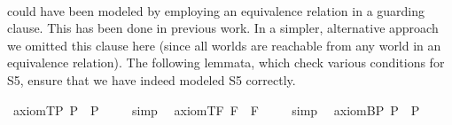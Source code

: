 \begin{isabellebody}
\endisatagproof
{\isafoldproof}%
%
\isadelimproof
%
\endisadelimproof
\ \isamarkupfalse%
%
\isadelimproof
\ %
\endisadelimproof
%
\isatagproof
{}\isamarkupfalse%
\ %
%
\endisatagproof
{\isafoldproof}%
%
\isadelimproof
%
\endisadelimproof
%
\isamarkuptrue%
%
\begin{isamarkuptext}%
\isa{{\isasymbox}} could have been modeled by employing an equivalence relation  in a 
 guarding clause. This has been done in previous work. In a simpler, alternative approach we omitted 
 this clause here (since all worlds are reachable from any world in an equivalence relation). The 
 following lemmata, which check various conditions for S5,  ensure that we have indeed 
 modeled S5 correctly.%
\end{isamarkuptext}%
\isamarkuptrue%
\isamarkupfalse%
\ axiom{\isacharunderscore}T{\isacharunderscore}P{\isacharcolon}\ {\isachardoublequoteopen}{\isacharbrackleft}\isactrlbold {\isasymbox}{\isacharparenleft}{\isasymphi}\isactrlsup P{\isacharparenright}\ \isactrlbold {\isasymrightarrow}\ {\isacharparenleft}{\isasymphi}\isactrlsup P{\isacharparenright}{\isacharbrackright}\ {\isacharequal}\ {\isasymtop}{\isachardoublequoteclose}%
\isadelimproof
\ %
\endisadelimproof
%
\isatagproof
{}\isamarkupfalse%
\ simp\ \isamarkupfalse%
%
\endisatagproof
{\isafoldproof}%
%
\isadelimproof
%
\endisadelimproof
\isanewline
{}\isamarkupfalse%
\ axiom{\isacharunderscore}T{\isacharunderscore}F{\isacharcolon}\ {\isachardoublequoteopen}{\isacharbrackleft}\isactrlbold {\isasymbox}{\isacharparenleft}{\isasymphi}\isactrlsup F{\isacharparenright}\ \isactrlbold {\isasymrightarrow}\ {\isacharparenleft}{\isasymphi}\isactrlsup F{\isacharparenright}{\isacharbrackright}\ {\isacharequal}\ {\isasymtop}{\isachardoublequoteclose}%
\isadelimproof
\ %
\endisadelimproof
%
\isatagproof
{}\isamarkupfalse%
\ simp\ \isamarkupfalse%
%
\endisatagproof
{\isafoldproof}%
%
\isadelimproof
%
\endisadelimproof
\isanewline
\isanewline
{}\isamarkupfalse%
\ axiom{\isacharunderscore}B{\isacharunderscore}P{\isacharcolon}\ {\isachardoublequoteopen}{\isacharbrackleft}{\isasymphi}\isactrlsup P\ \isactrlbold {\isasymrightarrow}\ \isactrlbold {\isasymbox}{\isacharparenleft}\isactrlbold {\isasymdiamond}{\isacharparenleft}{\isasymphi}\isactrlsup P{\isacharparenright}{\isacharparenright}{\isacharbrackright}\ {\isacharequal}\ {\isasymtop}{\isachardoublequoteclose}%

\end{isabellebody}
